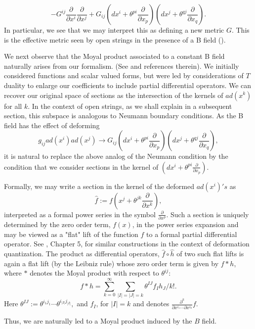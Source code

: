 \documentclass[a4paper,11pt]{amsart}
\begin{document}
$$-G^{ij}\frac{\partial}{\partial x^i}\frac{\partial}{\partial x^j}
+ G_{ij}(dx^i+\theta^{pi}\frac{\partial}{\partial x_p})
(dx^j+\theta^{qj}\frac{\partial}{\partial x_q}).$$
In particular, we see that we may interpret this as defining a new metric 
$G$. This is the effective metric seen by open strings in the presence of a B
 field (\cite{SW}).

We next observe that the Moyal product associated to a constant B field 
naturally arises from our formalism. (See \cite{SW} 
and references therein). We initially considered functions and scalar valued 
forms, but were led by considerations of $T$ duality to enlarge our
 coefficients
to include partial differential operators.  We can recover our original space 
of sections as the intersection of the kernels of $ad(x^k)$ for 
all $k$. In the context of open strings, as we shall explain in a subsequent
section, this subspace is analogous to Neumann
boundary conditions. As the B field has the effect of deforming 
\begin{equation}\label{def1}
g_{ij}ad(x^i)ad(x^j)\rightarrow G_{ij}(dx^i+\theta^{pi}\frac{\partial}{\partial x_p})
(dx^j+\theta^{qj}\frac{\partial}{\partial x_q}),
\end{equation}
it is natural to replace the above analog of the Neumann condition by the
condition that we consider sections in the kernel of 
$(dx^i+\theta^{pi}\frac{\partial}{\partial x_p}).$ 

 
Formally, we may write a section in the kernel of the deformed $ad(x^i)'s$ 
as 
$$\hat f:= f(x^j + \theta^{jk}\frac{\partial}{\partial x^k}),$$
interpreted as a formal power series in the symbol 
$\frac{\partial}{\partial x^p}.$ Such a section is uniquely determined by 
the zero order term, $f(x)$, in the power series expansion and may be viewed as a 
"flat" lift of the function $f$  to a formal partial differential operator. See 
\cite{Fed}, Chapter 5, for similar constructions in the context of deformation
quantization. The product as differential operators, $\hat f\circ\hat h$  of
 two such flat lifts is 
again a flat lift (by the Leibniz rule) whose zero order term 
is given by $f\ast h$, where $\ast$ denotes the Moyal product with respect to 
 $\theta^{ij}$: 
$$f\ast h = \sum_{k=0}^{\infty}\sum_{|I| = |J| = k}\theta^{IJ}f_Ih_J/k!.$$
Here $\theta^{IJ} := \theta^{i_1j_1}\cdots \theta^{i_{|I|}j_{|I|}},$ 
and $f_I$, for $|I| = k$ and
 denotes $\frac{\partial^k}{\partial x^{i_1}\cdots \partial x^{i_k}}f.$

Thus, we are naturally led to a Moyal product induced by the $B$ field.   
 
\end{document}
